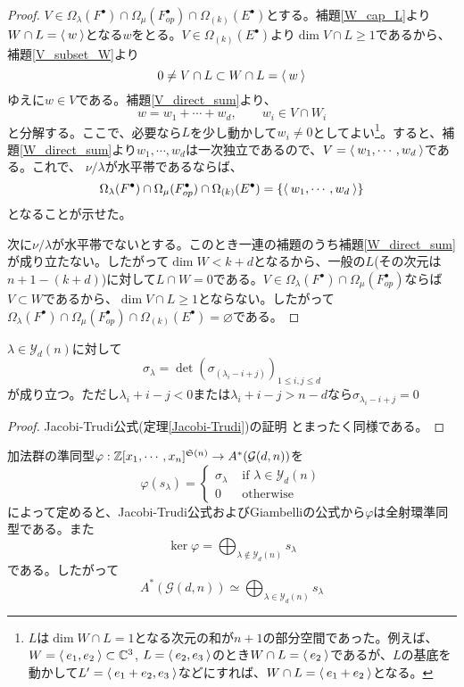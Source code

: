 \documentclass{ltjsreport}
\begin{document}
\begin{proof}
  $V\in \Omega_\lambda(F^\bullet)\cap \Omega_\mu(F^\bullet_{op})\cap \Omega_{(k)}(E^\bullet)$とする。補題\ref{W_cap_L}より$W\cap L=\langle\:w\:\rangle$となる$w$をとる。$V\in \Omega_{(k)}(E^\bullet)$より$\dim V\cap L\geq 1$であるから、補題\ref{V_subset_W}より
    \[
  0\neq V\cap L\subset W\cap L=\langle\:w\:\rangle   
  \]
  ゆえに$w\in V$である。補題\ref{V_direct_sum}より、
  \[
  w=w_1+\cdots+w_d,\qquad w_i\in V\cap W_i  
  \]
  と分解する。ここで、必要なら$L$を少し動かして$w_i\neq 0$としてよい\footnote{
    $L$は$\dim W\cap L=1$となる次元の和が$n+1$の部分空間であった。例えば、$W=\langle\:e_1,e_2\:\rangle\subset \mathbb{C}^3$, $L=\langle\:e_2,e_3\:\rangle$のとき$W\cap L=\langle\:e_2\:\rangle$であるが、$L$の基底を動かして$L'=\langle\:e_1+e_2,e_3\:\rangle$などにすれば、$W\cap L=\langle\:e_1+e_2\:\rangle$となる。
  }。すると、補題\ref{W_direct_sum}より$w_1,\cdots,w_d$は一次独立であるので、$V=\langle\:w_1,\cdots,w_d\:\rangle$である。これで、
  $\nu/\lambda$が水平帯であるならば、
  \[
    \Omega_\lambda(F^\bullet)\cap \Omega_\mu(F^\bullet_{op})\cap \Omega_{(k)}(E^\bullet)=\{\langle\:w_1,\cdots,w_d\:\rangle\}  
  \]
  となることが示せた。

  次に$\nu/\lambda$が水平帯でないとする。このとき一連の補題のうち補題\ref{W_direct_sum}が成り立たない。したがって$\dim W<k+d$となるから、一般の$L$(その次元は$n+1-(k+d)$)に対して$L\cap W=0$である。$V\in \Omega_{\lambda}(F^\bullet)\cap \Omega_{\mu}(F^\bullet_{op})$ならば$V\subset W$であるから、$\dim V\cap L \geq 1$とならない。したがって$\Omega_\lambda(F^\bullet)\cap \Omega_\mu(F^\bullet_{op})\cap \Omega_{(k)}(E^\bullet)=\varnothing$である。
\end{proof}




\begin{cor}[Giambelliの公式]\label{giambelli}
  $\lambda\in\mathcal{Y}_d(n)$に対して
    \[
    \sigma_\lambda
    =\det(\sigma_{(\lambda_{i}-i+j)})_{1\leq i,j\leq d}
    \]
    が成り立つ。ただし$\lambda_i+i-j<0$または$\lambda_i+i-j>n-d$なら$\sigma_{\lambda_i-i+j}=0$
\end{cor}

\begin{proof}
  Jacobi-Trudi公式(定理\ref{Jacobi-Trudi})の証明
  とまったく同様である。
\end{proof}


加法群の準同型$\varphi:\mathbb{Z}[x_1,\cdots,x_n]^{\mathfrak{S}(n)}\rightarrow A^*(\mathcal{G}(d,n))$を
\[
\varphi(s_\lambda)=\left\{\begin{array}{cc}
  \sigma_{\lambda} & \text{ if } \lambda\in\mathcal{Y}_d(n)\\
  0 & \text{ otherwise}
\end{array}\right.
\]
によって定めると、Jacobi-Trudi公式およびGiambelliの公式から$\varphi$は全射環準同型である。また
\[
\ker\varphi=\bigoplus_{\lambda\notin\mathcal{Y}_d(n)}s_\lambda
\]
である。したがって
\[
  A^*(\mathcal{G}(d,n))\simeq\bigoplus_{\lambda\in\mathcal{Y}_d(n)}s_\lambda
\]
\end{document}
